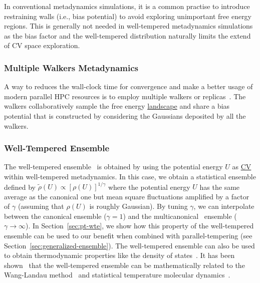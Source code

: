 \documentclass[9pt,review]{livecoms}
\begin{document}
In conventional metadynamics simulations, it is a common practise to introduce restraining walls (i.e., bias potential) to avoid exploring unimportant free energy regions. This is generally not needed in well-tempered metadynamics simulations as the bias factor and the well-tempered distribution naturally limits the extend of CV space exploration.

\subsubsection{Multiple Walkers Metadynamics}
A way to reduces the wall-clock time for convergence and make a better usage of modern parallel HPC resources is to employ multiple walkers or replicas~\cite{Raiteri-JPCB-2006}. The walkers collaboratively sample the free energy \hyperlink{ref:FES} {landscape} and share a bias potential that is constructed by considering the Gaussians deposited by all the walkers.
\subsubsection{Well-Tempered Ensemble}
\label{sec:wtensemble}
The well-tempered ensemble~\cite{Bonomi-PRL-2010} is obtained by using the potential energy $U$ as \hyperlink{ref:CV} {CV} within well-tempered metadynamics. In this case, we obtain a statistical ensemble defined by $\tilde{\rho}(U) \propto [\rho(U)]^{1/\gamma}$ where the potential energy $U$ has the same average as the canonical one but mean square fluctuations amplified by a factor of $\gamma$ (assuming that $\rho(U)$ is roughly Gaussian). By tuning $\gamma$, we can interpolate between the canonical ensemble ($\gamma=1$) and the multicanonical~\cite{Berg1992_Multicanonical} ensemble ($\gamma \to \infty$). In Section~\ref{sec:pt-wte}, we show how this property of the well-tempered ensemble can be used to our benefit when combined with parallel-tempering (see Section~\ref{sec:generalized-ensemble}). The well-tempered ensemble can also be used to obtain thermodynamic properties like the density of states~\cite{Valsson-JCTC-2013}. It has been shown~\cite{Junghans2014wte-wl} that the well-tempered ensemble can be mathematically related to the Wang-Landau method~\cite{wang-landau:prl:2001:wang-landau} and statistical temperature molecular dynamics~\cite{Kim2006_PRL_STMD}.
\end{document}
